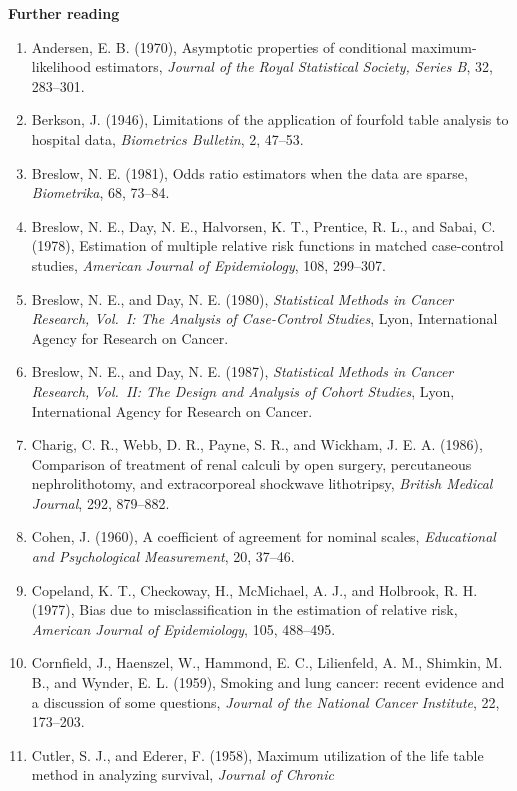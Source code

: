 \documentclass[11pt,a4paper]{article}
\numberwithin{equation}{section}
\theoremstyle{definition}
\newcommand{\subhead}[1]{%
  \par\medskip\noindent\textbf{#1}\par\nobreak\smallskip}
\begin{document}
\subhead{Further reading}
\sloppy
\begin{enumerate}
\item Andersen, E. B. (1970), Asymptotic properties of conditional maximum-likelihood estimators, \emph{Journal of the Royal Statistical
Society, Series B}, 32, 283--301.
\item Berkson, J. (1946), Limitations of the application of fourfold table analysis to hospital data, \emph{Biometrics Bulletin}, 2,
47--53.
\item Breslow, N. E. (1981), Odds ratio estimators when the data are sparse, \emph{Biometrika}, 68, 73--84.
\item Breslow, N. E., Day, N. E., Halvorsen, K. T., Prentice, R. L., and Sabai, C. (1978), Estimation of multiple relative risk functions
in matched case-control studies, \emph{American Journal of Epidemiology}, 108, 299--307.
\item Breslow, N. E., and Day, N. E. (1980), \emph{Statistical Methods in Cancer Research, Vol.~I: The Analysis of Case-Control Studies}, Lyon,
International Agency for Research on Cancer.
\item Breslow, N. E., and Day, N. E. (1987), \emph{Statistical Methods in Cancer Research, Vol.~II: The Design and Analysis of Cohort
Studies}, Lyon, International Agency for Research on Cancer.
\item Charig, C. R., Webb, D. R., Payne, S. R., and Wickham, J. E. A. (1986), Comparison of treatment of renal calculi by open surgery,
percutaneous nephrolithotomy, and extracorporeal shockwave lithotripsy, \emph{British Medical Journal}, 292, 879--882.
\item Cohen, J. (1960), A coefficient of agreement for nominal scales, \emph{Educational and Psychological
Measurement}, 20, 37--46.
\item Copeland, K. T., Checkoway, H., McMichael, A. J., and Holbrook, R. H. (1977), Bias due to misclassification in the estimation of relative risk,
\emph{American Journal of Epidemiology}, 105, 488--495.
\item Cornfield, J., Haenszel, W., Hammond, E. C., Lilienfeld, A. M., Shimkin, M. B., and Wynder, E. L. (1959), Smoking and lung cancer:
recent evidence and a discussion of some questions, \emph{Journal of the National Cancer Institute}, 22, 173--203.
\item Cutler, S. J., and Ederer, F. (1958), Maximum utilization of the life table method in analyzing survival, \emph{Journal of Chronic
}
\end{enumerate}
\end{document}
